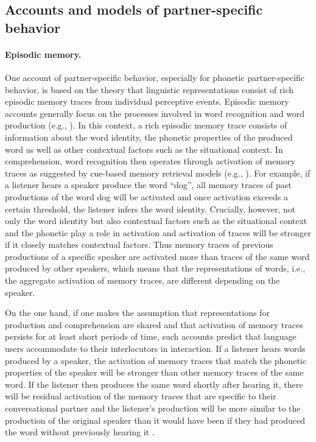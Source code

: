 \subsection{Accounts and models of partner-specific behavior}

\paragraph{Episodic memory.} One account of partner-specific behavior, especially for phonetic partner-specific behavior, is based
on the theory that linguistic representations consist of rich episodic memory traces from individual perceptive events. Episodic memory
accounts generally focus on the processes involved in word recognition and word production (e.g., \cite{Goldinger1998,Johnson1996,Pierrehumbert2001}).
In this context, a rich episodic memory trace consists of information about the word identity, the phonetic properties of the produced word as well as other contextual factors
such as the situational context. In comprehension, word recognition then operates through
activation of memory traces as suggested by cue-based memory retrieval models (e.g., \cite{Ratcliff1979}). For example, if a listener hears a speaker produce 
the word ``dog'', all memory traces of past productions of the word
dog will be activated and once activation exceeds a certain threshold, the listener infers the word identity. Crucially, however, not only the word identity
but also contextual factors such as the situational context and the phonetic play a role in activation and activation of traces will be stronger if it closely matches
contextual factors. Thus memory traces of previous productions of a specific speaker are activated more than traces of the same word produced by other speakers,
which means that the representations of words, i.e., the aggregate activation of memory traces, are different depending on the speaker.

On the one hand, if one makes the assumption that representations for production and comprehension are shared and that activation of memory traces persists for at least
short periods of time, such accounts predict that language users
accommodate to their interlocutors in interaction. If a listener hears words produced by a speaker, the activation of memory traces that match the phonetic properties of the speaker
will be stronger than other memory traces of the same word. If the listener then produces the same word shortly after hearing it, there will be residual activation of the memory 
traces that are specific to their conversational partner and the listener's production will be more similar to the production of the original speaker than it would have been if they had
produced the word without previously hearing it \cite{Goldinger1998}.

